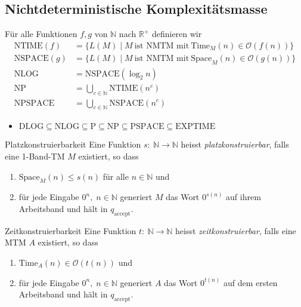 \documentclass[a4paper,10pt]{article}
\begin{document}
\subsection{Nichtdeterministische Komplexitätsmasse}
Für alle Funktionen $f, g$ von $\mathbb{N}$ nach $\mathbb{R}^+$ definieren wir
\begin{align*}
    \textrm{NTIME}(f) &= \{L(M) \;|\; M\ \text{ist NMTM mit}\ \textrm{Time}_M(n) \in \mathcal{O}(f(n))\}\\
    \textrm{NSPACE}(g) &= \{L(M) \;|\; M\ \text{ist NMTM mit}\ \textrm{Space}_M(n) \in \mathcal{O}(g(n))\}\\
    \textrm{NLOG} &= \textrm{NSPACE}(\log_2 n)\\
    \textrm{NP} &= \bigcup_{c \in \mathbb{N}} \textrm{NTIME}(n^c)\\
    \textrm{NPSPACE} &= \bigcup_{c \in \mathbb{N}} \textrm{NSPACE}(n^c)
\end{align*}
\begin{itemize}
    \item $\textrm{DLOG} \subseteq \textrm{NLOG} \subseteq \textrm{P} \subseteq \textrm{NP} \subseteq \textrm{PSPACE} \subseteq \textrm{EXPTIME}$
\end{itemize}
\begin{subbox}{Platzkonstruierbarkeit}
    Eine Funktion $s:\: \mathbb{N} \to \mathbb{N}$ heisst \emph{platzkonstruierbar}, falls eine 1-Band-TM $M$ existiert, so dass
    \begin{enumerate}
        \item $\textrm{Space}_M(n) \leq s(n)$ für alle $n \in \mathbb{N}$ und
        \item für jede Eingabe $0^n,\; n \in \mathbb{N}$ generiert $M$ das Wort $0^{s(n)}$ auf ihrem Arbeitsband und hält in $q_\textrm{accept}$.
    \end{enumerate}
\end{subbox}
\begin{subbox}{Zeitkonstruierbarkeit}
    Eine Funktion $t:\: \mathbb{N} \to \mathbb{N}$ heisst \emph{zeitkonstruierbar}, falls eine MTM $A$ existiert, so dass
    \begin{enumerate}
        \item $\textrm{Time}_A(n) \in \mathcal{O}(t(n))$ und
        \item für jede Eingabe $0^n,\; n \in \mathbb{N}$ generiert $A$ das Wort $0^{t(n)}$ auf dem ersten Arbeitsband und hält in $q_\textrm{accept}$.
    \end{enumerate}
\end{subbox}
\end{document}
